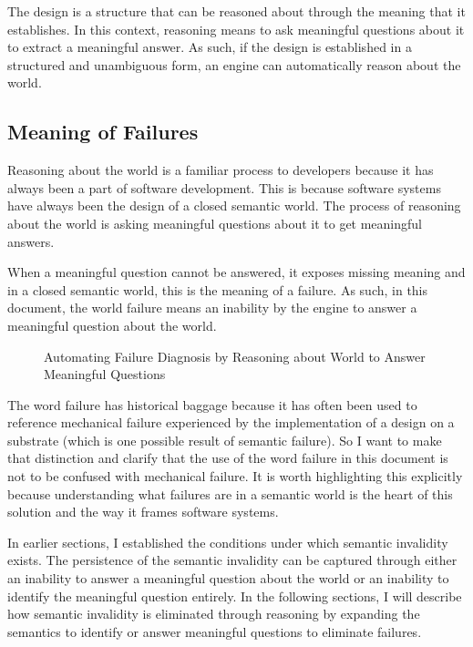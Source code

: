 The design is a structure that can be reasoned about through the meaning that it establishes. In this context, reasoning means to ask meaningful questions about it to extract a meaningful answer. As such, if the design is established in a structured and unambiguous form, an engine can automatically reason about the world.

\subsection{Meaning of Failures}

Reasoning about the world is a familiar process to developers because it has always been a part of software development. This is because software systems have always been the design of a closed semantic world. The process of reasoning about the world is asking meaningful questions about it to get meaningful answers.

When a meaningful question cannot be answered, it exposes missing meaning and in a closed semantic world, this is the meaning of a failure. As such, in this document, the world failure means an inability by the engine to answer a meaningful question about the world.

\begin{figure}[htbp]
    \centering
    
    \caption{Automating Failure Diagnosis by Reasoning about World to Answer Meaningful Questions}
    \label{fig:meaning_of_failures}
\end{figure} 

The word failure has historical baggage because it has often been used to reference mechanical failure experienced by the implementation of a design on a substrate (which is one possible result of semantic failure). So I want to make that distinction and clarify that the use of the word failure in this document is not to be confused with mechanical failure. It is worth highlighting this explicitly because understanding what failures are in a semantic world is the heart of this solution and the way it frames software systems.

In earlier sections, I established the conditions under which semantic invalidity exists. The persistence of the semantic invalidity can be captured through either an inability to answer a meaningful question about the world or an inability to identify the meaningful question entirely. In the following sections, I will describe how semantic invalidity is eliminated through reasoning by expanding the semantics to identify or answer meaningful questions to eliminate failures. 

